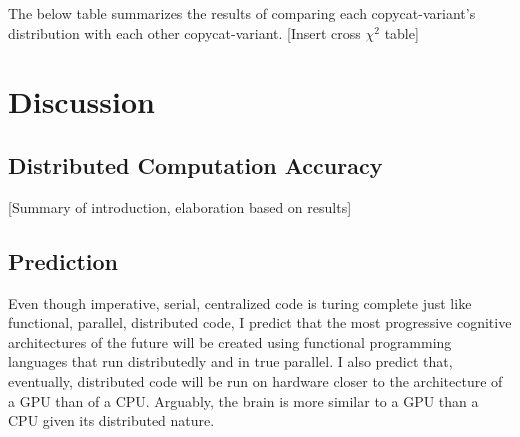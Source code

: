 \documentclass[a4paper]{article}
\begin{document}
        The below table summarizes the results of comparing each copycat-variant's distribution with each other copycat-variant.
        [Insert cross $\chi^2$ table]

\section{Discussion}

    \subsection{Distributed Computation Accuracy}

        [Summary of introduction, elaboration based on results]

    \subsection{Prediction}

        Even though imperative, serial, centralized code is turing complete just like functional, parallel, distributed code, I predict that the most progressive cognitive architectures of the future will be created using functional programming languages that run distributedly and in true parallel. 
        I also predict that, eventually, distributed code will be run on hardware closer to the architecture of a GPU than of a CPU.
        Arguably, the brain is more similar to a GPU than a CPU given its distributed nature.



\end{document}
